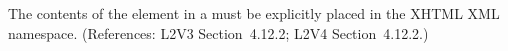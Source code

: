 The contents of the  element in a \Constraint must be
explicitly placed in the XHTML XML namespace.  (References: L2V3
Section~4.12.2; L2V4 Section~4.12.2.)
